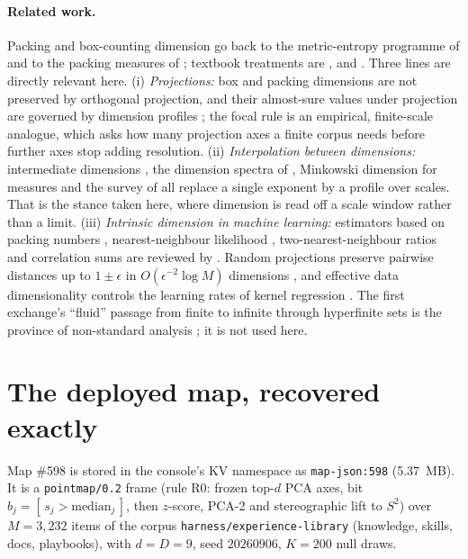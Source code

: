 \documentclass[11pt,a4paper]{article}
\theoremstyle{plain}
\theoremstyle{remark}
\begin{document}
\paragraph{Related work.} Packing and box-counting dimension go back to the metric-entropy programme of \citet{kolmogorov1959entropy} and to the packing measures of \citet{tricot1982two}; textbook treatments are \citet{falconer2014fractal}, \citet{mattila1995geometry} and \citet{federer1969geometric}. Three lines are directly relevant here. (i) \emph{Projections:} box and packing dimensions are not preserved by orthogonal projection, and their almost-sure values under projection are governed by dimension profiles \citep{falconer1996projection,falconer1997packing}; the focal rule is an empirical, finite-scale analogue, which asks how many projection axes a finite corpus needs before further axes stop adding resolution. (ii) \emph{Interpolation between dimensions:} intermediate dimensions \citep{falconer2020intermediate}, the dimension spectra of \citet{fraser2018new}, Minkowski dimension for measures \citep{falconer2023minkowski} and the survey of \citet{fraser2026invitation} all replace a single exponent by a profile over scales. That is the stance taken here, where dimension is read off a scale window rather than a limit. (iii) \emph{Intrinsic dimension in machine learning:} estimators based on packing numbers \citep{kegl2002intrinsic}, nearest-neighbour likelihood \citep{levina2004maximum}, two-nearest-neighbour ratios \citep{facco2017estimating} and correlation sums \citep{grassberger1983characterization} are reviewed by \citet{camastra2016intrinsic}. Random projections preserve pairwise distances up to $1\pm\epsilon$ in $O(\epsilon^{-2}\log M)$ dimensions \citep{dasgupta2003elementary}, and effective data dimensionality controls the learning rates of kernel regression \citep{zhang2005learning}. The first exchange's ``fluid'' passage from finite to infinite through hyperfinite sets is the province of non-standard analysis \citep{robinson1966nonstandard}; it is not used here.

\section{The deployed map, recovered exactly}
\label{sec:data}

Map \#598 is stored in the console's KV namespace as \texttt{map-json:598} (5.37~MB). It is a \texttt{pointmap/0.2} frame (rule R0: frozen top-$d$ PCA axes, bit $b_j=[\,s_j>\mathrm{median}_j\,]$, then $z$-score, PCA-2 and stereographic lift to $S^2$) over $M=3{,}232$ items of the corpus \texttt{harness/experience-library} (knowledge, skills, docs, playbooks), with $d=D=9$, seed $20260906$, $K=200$ null draws.
\end{document}
